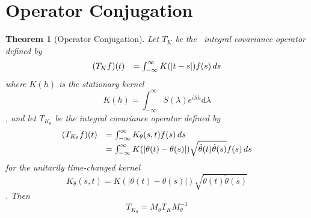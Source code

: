 \documentclass{article}
\newcommand{\mathd}{\mathrm{d}}
\newtheorem{theorem}{Theorem}
\begin{document}
\section{Operator Conjugation}\label{sec:conjugation}

\begin{theorem}
  [Operator Conjugation]\label{thm:operator_conjugation} Let $T_K$ be the \
  integral covariance operator defined by
  \begin{equation}
    \label{eq:integral_op_original} \begin{array}{ll}
      (T_K f) (t) & = \int_{- \infty}^{\infty} K (|t - s|) f (s) 
      \hspace{0.17em} ds
    \end{array}
  \end{equation}
  where $K (h)$ is the stationary kernel
  \begin{equation}
    K (h) = \int_{- \infty}^{\infty} S (\lambda) e^{i \lambda h} \mathd
    \lambda
  \end{equation}
  , and let $T_{K_{\theta}}$ be the integral covariance operator defined by
  \begin{equation}
    \label{eq:integral_op_transformed} \begin{array}{ll}
      (T_{K_{\theta}} f) (t) & = \int_{- \infty}^{\infty} K_{\theta} (s, t) f
      (s)  \hspace{0.17em} ds\\
      & = \int_{- \infty}^{\infty} K (| \theta (t) - \theta (s) |) 
      \sqrt{\dot{\theta} (t) \dot{\theta} (s)} f (s)  \hspace{0.17em} ds
    \end{array}
  \end{equation}
  for the unitarily time-changed kernel
  \begin{equation}
    K_{\theta} (s, t) = K (| \theta (t) - \theta (s) |) \sqrt{\dot{\theta} (t)
    \dot{\theta} (s)}
  \end{equation}
  . Then
  \begin{equation}
    \label{eq:conjugation} T_{K_{\theta}} = M_{\theta} T_K M_{\theta}^{- 1}
  \end{equation}
\end{theorem}
\end{document}
